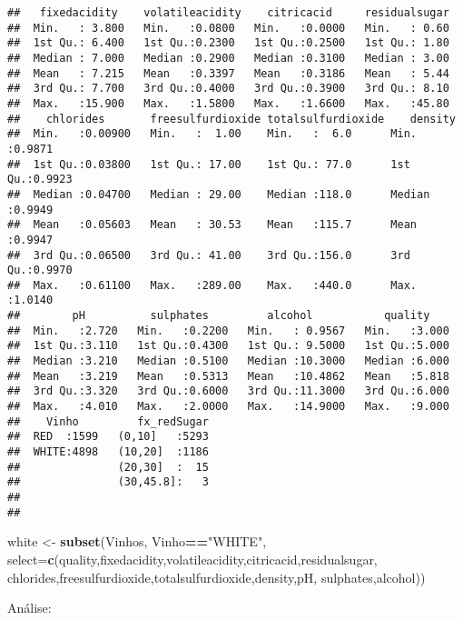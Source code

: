 \documentclass[]{article}
\newenvironment{Shaded}{\begin{snugshade}}{\end{snugshade}}
\newcommand{\KeywordTok}[1]{\textcolor[rgb]{0.13,0.29,0.53}{\textbf{#1}}}
\newcommand{\DataTypeTok}[1]{\textcolor[rgb]{0.13,0.29,0.53}{#1}}
\newcommand{\StringTok}[1]{\textcolor[rgb]{0.31,0.60,0.02}{#1}}
\newcommand{\OperatorTok}[1]{\textcolor[rgb]{0.81,0.36,0.00}{\textbf{#1}}}
\newcommand{\NormalTok}[1]{#1}
\begin{document}
\begin{verbatim}
##   fixedacidity    volatileacidity    citricacid     residualsugar  
##  Min.   : 3.800   Min.   :0.0800   Min.   :0.0000   Min.   : 0.60  
##  1st Qu.: 6.400   1st Qu.:0.2300   1st Qu.:0.2500   1st Qu.: 1.80  
##  Median : 7.000   Median :0.2900   Median :0.3100   Median : 3.00  
##  Mean   : 7.215   Mean   :0.3397   Mean   :0.3186   Mean   : 5.44  
##  3rd Qu.: 7.700   3rd Qu.:0.4000   3rd Qu.:0.3900   3rd Qu.: 8.10  
##  Max.   :15.900   Max.   :1.5800   Max.   :1.6600   Max.   :45.80  
##    chlorides       freesulfurdioxide totalsulfurdioxide    density      
##  Min.   :0.00900   Min.   :  1.00    Min.   :  6.0      Min.   :0.9871  
##  1st Qu.:0.03800   1st Qu.: 17.00    1st Qu.: 77.0      1st Qu.:0.9923  
##  Median :0.04700   Median : 29.00    Median :118.0      Median :0.9949  
##  Mean   :0.05603   Mean   : 30.53    Mean   :115.7      Mean   :0.9947  
##  3rd Qu.:0.06500   3rd Qu.: 41.00    3rd Qu.:156.0      3rd Qu.:0.9970  
##  Max.   :0.61100   Max.   :289.00    Max.   :440.0      Max.   :1.0140  
##        pH          sulphates         alcohol           quality     
##  Min.   :2.720   Min.   :0.2200   Min.   : 0.9567   Min.   :3.000  
##  1st Qu.:3.110   1st Qu.:0.4300   1st Qu.: 9.5000   1st Qu.:5.000  
##  Median :3.210   Median :0.5100   Median :10.3000   Median :6.000  
##  Mean   :3.219   Mean   :0.5313   Mean   :10.4862   Mean   :5.818  
##  3rd Qu.:3.320   3rd Qu.:0.6000   3rd Qu.:11.3000   3rd Qu.:6.000  
##  Max.   :4.010   Max.   :2.0000   Max.   :14.9000   Max.   :9.000  
##    Vinho         fx_redSugar  
##  RED  :1599   (0,10]   :5293  
##  WHITE:4898   (10,20]  :1186  
##               (20,30]  :  15  
##               (30,45.8]:   3  
##                               
## 
\end{verbatim}

\begin{Shaded}
\begin{Highlighting}[]
\NormalTok{white <-}\StringTok{ }\KeywordTok{subset}\NormalTok{(Vinhos, Vinho}\OperatorTok{==}\StringTok{"WHITE"}\NormalTok{, }\DataTypeTok{select=}\KeywordTok{c}\NormalTok{(quality,fixedacidity,volatileacidity,citricacid,residualsugar,}
\NormalTok{                                                 chlorides,freesulfurdioxide,totalsulfurdioxide,density,pH,}
\NormalTok{                                                 sulphates,alcohol))}
\end{Highlighting}
\end{Shaded}

Análise:
\end{document}
